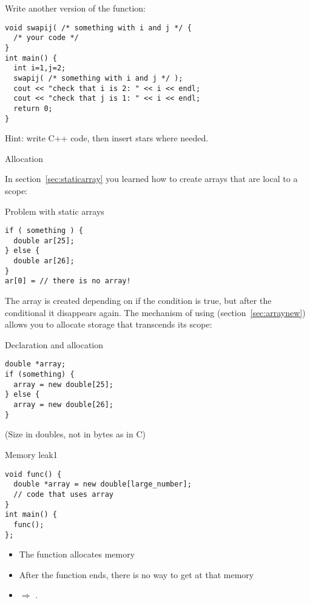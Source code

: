 \begin{exercise}
  \label{ex:c-star-swap}
  Write another version of the  function:
\begin{verbatim}
void swapij( /* something with i and j */ {
  /* your code */
}
int main() {
  int i=1,j=2;
  swapij( /* something with i and j */ );
  cout << "check that i is 2: " << i << endl;
  cout << "check that j is 1: " << i << endl;
  return 0;
}
\end{verbatim}
Hint: write C++ code, then insert stars where needed.
\end{exercise}

 {Allocation}

In section~\ref{sec:staticarray} you learned how to create arrays that
are local to a scope:

\begin{block}{Problem with static arrays}
  \label{sl:no-static-alloc}
\begin{verbatim}
if ( something ) {
  double ar[25];
} else {
  double ar[26];
}
ar[0] = // there is no array!
\end{verbatim}
\end{block}

The array  is created depending on if the condition is true, but
after
the conditional it disappears again. The mechanism of using
 (section~\ref{sec:arraynew}) allows you to allocate
storage that transcends its scope:

\begin{block}{Declaration and allocation}
  \label{sl:c-array-new}
\begin{verbatim}
double *array;
if (something) {
  array = new double[25];
} else {
  array = new double[26];
}
\end{verbatim}
(Size in doubles, not in bytes as in C)
\end{block}

\begin{block}{Memory leak1}
  \label{sl:leak1}
\begin{verbatim}
void func() {
  double *array = new double[large_number];
  // code that uses array
}
int main() {
  func();
};
\end{verbatim}
\begin{itemize}
\item
  The function allocates memory
\item After the function ends, there is no way to get at that memory
\item $\Rightarrow$ .
\end{itemize}

\end{block}

